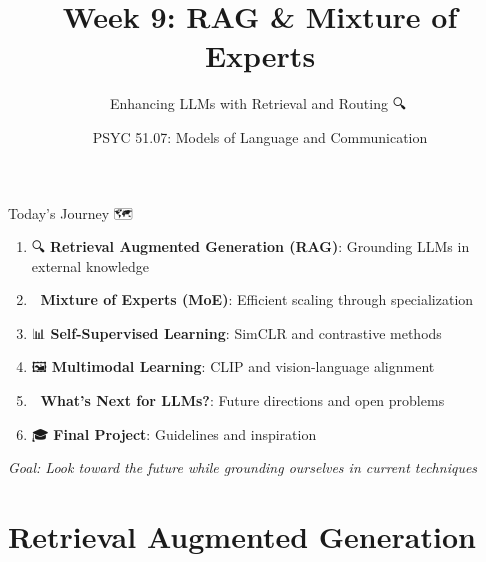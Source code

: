 \documentclass[aspectratio=169]{beamer}
\title{Week 9: RAG \& Mixture of Experts}
\subtitle{Enhancing LLMs with Retrieval and Routing 🔍🚀}
\author{PSYC 51.07: Models of Language and Communication}
\date{}
\begin{document}
\begin{frame}[shrink=10]
\titlepage
\end{frame}

\begin{frame}[shrink=10]{Today's Journey 🗺️}
\large
\begin{enumerate}\setlength{\itemsep}{0pt}
    \item 🔍 \textbf{Retrieval Augmented Generation (RAG)}: Grounding LLMs in external knowledge
    \item 🎯 \textbf{Mixture of Experts (MoE)}: Efficient scaling through specialization
    \item 📊 \textbf{Self-Supervised Learning}: SimCLR and contrastive methods
    \item 🖼️ \textbf{Multimodal Learning}: CLIP and vision-language alignment
    \item 🔮 \textbf{What's Next for LLMs?}: Future directions and open problems
    \item 🎓 \textbf{Final Project}: Guidelines and inspiration
\end{enumerate}

\vspace{1em}
\begin{center}
\textit{Goal: Look toward the future while grounding ourselves in current techniques}
\end{center}
\end{frame}

\section{Retrieval Augmented Generation}
\end{document}
